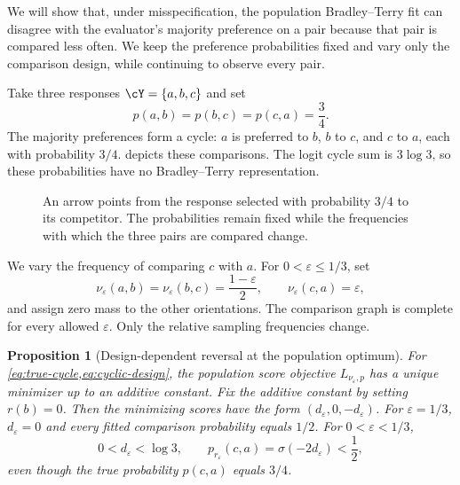 \documentclass[11pt,twoside]{article}
\newtheorem{proposition}[theorem]{Proposition}
\theoremstyle{definition}
\theoremstyle{remark}
\begin{document}
We will show that, under misspecification, the population Bradley--Terry
fit can disagree with the evaluator's majority preference on a pair because
that pair is compared less often. We keep the preference probabilities
fixed and vary only the comparison design, while continuing to observe
every pair.

Take three responses $\cY=\{a,b,c\}$ and set
\begin{equation}
 p(a,b)=p(b,c)=p(c,a)=\frac34.
 \label{eq:true-cycle}
\end{equation}
The majority preferences form a cycle: $a$ is preferred to $b$, $b$ to $c$,
and $c$ to $a$, each with probability $3/4$.  depicts these
comparisons. The logit cycle sum is $3\log3$, so these probabilities have
no Bradley--Terry representation.

\begin{figure}[ht]
\centering
{}
\caption{An arrow points from the response selected with probability $3/4$
to its competitor. The probabilities remain fixed while the frequencies
with which the three pairs are compared change.}
\label{fig:cycle}
\end{figure}

We vary the frequency of comparing $c$ with $a$. For
$0<\varepsilon\le1/3$, set
\begin{equation}
 \nu_\varepsilon(a,b)=\nu_\varepsilon(b,c)=\frac{1-\varepsilon}{2},
 \qquad \nu_\varepsilon(c,a)=\varepsilon,
 \label{eq:cyclic-design}
\end{equation}
and assign zero mass to the other orientations. The comparison graph
is complete for every allowed $\varepsilon$. Only the relative sampling
frequencies change.

\begin{proposition}[Design-dependent reversal at the population optimum]
\label{prop:design-reversal}
For \cref{eq:true-cycle,eq:cyclic-design}, the population score objective
$L_{\nu_\varepsilon,p}$ has a unique minimizer up to an
additive constant.
Fix the additive constant by setting $r(b)=0$. Then the minimizing scores
have the form $(d_\varepsilon,0,-d_\varepsilon)$.
For $\varepsilon=1/3$, $d_\varepsilon=0$ and every fitted comparison
probability equals $1/2$. For $0<\varepsilon<1/3$,
\begin{equation}
 0<d_\varepsilon<\log3,
 \qquad p_{r_\varepsilon}(c,a)=\sigma(-2d_\varepsilon)<\frac12,
 \label{eq:design-reversal}
\end{equation}
even though the true probability $p(c,a)$ equals $3/4$.
\end{proposition}
\end{document}
